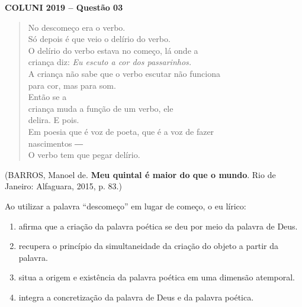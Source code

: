 \textbf{COLUNI 2019 -- Questão 03}\par\medskip \begin{center}\begin{verse}
No descomeço era o verbo.\\
Só depois é que veio o delírio do verbo.\\
O delírio do verbo estava no começo, lá onde a\\
criança diz: \textit{Eu escuto a cor dos passarinhos.}\\
A criança não sabe que o verbo escutar não funciona\\
para cor, mas para som.\\
Então se a\\
criança muda a função de um verbo, ele\\
delira. E pois.\\
Em poesia que é voz de poeta, que é a voz de fazer\\
nascimentos ―\\
O verbo tem que pegar delírio.
\end{verse}
(BARROS, Manoel de. \textbf{Meu quintal é maior do que o mundo}. Rio de Janeiro: Alfaguara, 2015, p. 83.)\end{center}

Ao utilizar a palavra “descomeço” em lugar de começo, o eu lírico:\begin{enumerate}
\item afirma que a criação da palavra poética se deu por meio da palavra de Deus.
\item recupera o princípio da simultaneidade da criação do objeto a partir da palavra.
\item situa a origem e existência da palavra poética em uma dimensão atemporal.
\item integra a concretização da palavra de Deus e da palavra poética.\end{enumerate}
